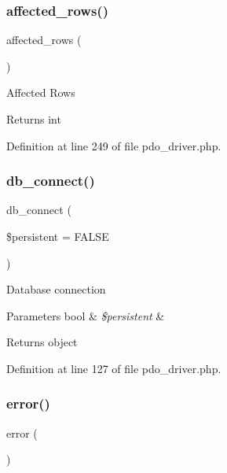 \subsubsection{\texorpdfstring{affected\_rows()}{affected\_rows()}}
{\footnotesize\ttfamily affected\+\_\+rows (\begin{DoxyParamCaption}{ }\end{DoxyParamCaption})}

Affected Rows

\begin{DoxyReturn}{Returns}
int 
\end{DoxyReturn}


Definition at line 249 of file pdo\+\_\+driver.\+php.

\mbox{\label{class_c_i___d_b__pdo__driver_a52bf595e79e96cc0a7c907a9b45aeb4d}} 
\subsubsection{\texorpdfstring{db\_connect()}{db\_connect()}}
{\footnotesize\ttfamily db\+\_\+connect (\begin{DoxyParamCaption}\item[{}]{\$persistent = {\ttfamily FALSE} }\end{DoxyParamCaption})}

Database connection


\begin{DoxyParams}[1]{Parameters}
bool & {\em \$persistent} & \\
\hline
\end{DoxyParams}
\begin{DoxyReturn}{Returns}
object 
\end{DoxyReturn}


Definition at line 127 of file pdo\+\_\+driver.\+php.

\mbox{\label{class_c_i___d_b__pdo__driver_a43b8d30b879d4f09ceb059b02af2bc02}} 
\subsubsection{\texorpdfstring{error()}{error()}}
{\footnotesize\ttfamily error (\begin{DoxyParamCaption}{ }\end{DoxyParamCaption})}

